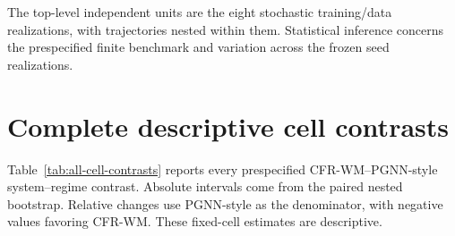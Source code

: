 The top-level independent units are the eight stochastic training/data realizations, with trajectories nested within them. Statistical inference concerns the prespecified finite benchmark and variation across the frozen seed realizations.

\section{Complete descriptive cell contrasts}

Table~\ref{tab:all-cell-contrasts} reports every prespecified CFR-WM--PGNN-style
system--regime contrast. Absolute intervals come from the paired nested
bootstrap. Relative changes use PGNN-style as the denominator, with negative values
favoring CFR-WM. These fixed-cell estimates are descriptive.

\begin{table}[ht]
\centering
\small
\caption{All 15 descriptive CFR-WM versus PGNN-style NRMSE-25 contrasts.}
\label{tab:all-cell-contrasts}
\resizebox{\textwidth}{!}{}
\end{table}
